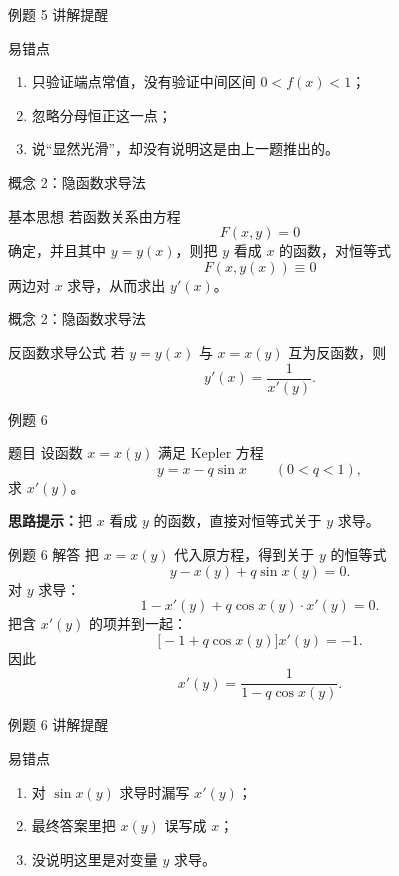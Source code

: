 ﻿\documentclass[aspectratio=169,10pt]{ctexbeamer}
\begin{document}
\begin{frame}[t]{例题 5 讲解提醒}
\small
\begin{block}{易错点}
\begin{enumerate}
  \item 只验证端点常值，没有验证中间区间 $0<f(x)<1$；
  \item 忽略分母恒正这一点；
  \item 说“显然光滑”，却没有说明这是由上一题推出的。
\end{enumerate}
\end{block}
\end{frame}

\begin{frame}[t]{概念 2：隐函数求导法}
\small
\begin{block}{基本思想}
若函数关系由方程
\[
F(x,y)=0
\]
确定，并且其中 $y=y(x)$，则把 $y$ 看成 $x$ 的函数，对恒等式
\[
F(x,y(x))\equiv0
\]
两边对 $x$ 求导，从而求出 $y'(x)$。
\end{block}
\end{frame}

\begin{frame}[t]{概念 2：隐函数求导法}
\small
\begin{block}{反函数求导公式}
若 $y=y(x)$ 与 $x=x(y)$ 互为反函数，则
\[
\boxed{y'(x)=\frac{1}{x'(y)}}.
\]
\end{block}
\end{frame}

\begin{frame}[t]{例题 6}
\small
\begin{block}{题目}
设函数 $x=x(y)$ 满足 Kepler 方程
\[
y=x-q\sin x\qquad (0<q<1),
\]
求 $x'(y)$。
\end{block}

\vspace{0.4em}
\textbf{思路提示：}把 $x$ 看成 $y$ 的函数，直接对恒等式关于 $y$ 求导。
\end{frame}

\begin{frame}[t]{例题 6 解答}
\small
把 $x=x(y)$ 代入原方程，得到关于 $y$ 的恒等式
\[
y-x(y)+q\sin x(y)=0.
\]
对 $y$ 求导：
\[
1-x'(y)+q\cos x(y)\cdot x'(y)=0.
\]
把含 $x'(y)$ 的项并到一起：
\[
\bigl[-1+q\cos x(y)\bigr]x'(y)=-1.
\]
因此
\[
\boxed{x'(y)=\frac{1}{1-q\cos x(y)}.}
\]
\end{frame}

\begin{frame}[t]{例题 6 讲解提醒}
\small
\begin{block}{易错点}
\begin{enumerate}
  \item 对 $\sin x(y)$ 求导时漏写 $x'(y)$；
  \item 最终答案里把 $x(y)$ 误写成 $x$；
  \item 没说明这里是对变量 $y$ 求导。
\end{enumerate}
\end{block}
\end{frame}
\end{document}

